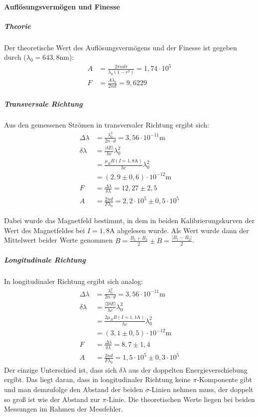 \paragraph{Auflösungsvermögen und Finesse}
\subparagraph{Theorie}
Der theoretische Wert des Auflösungsvermögens und der Finesse ist gegeben durch ($\lambda_0 =643,8 \si{\nano\meter}$):
\begin{align*}
A &= \frac{2\pi n d r}{\lambda_0 (1-r^2)} = 1,74\cdot 10^5\\
F &= \frac{A \lambda_0}{2 n d} = 9,6229 
\end{align*}

\subparagraph{Transversale Richtung}
Aus den gemessenen Strömen in transversaler Richtung ergibt sich:
\begin{align*}
\Delta \lambda &= \frac{\lambda_0^2}{2n\cdot d} = 3,56 \cdot 10^{-11} \si{\meter}\\
\delta \lambda &= \frac{|\delta E|}{hc}\lambda_0^2\\
	&= \frac{\mu_B B(I = 1,8\si{\ampere})}{hc}\lambda_0^2\\
	&= (2,9\pm 0,6) \cdot 10^{-12} \si{\meter}\\
F &= \frac{\Delta \lambda}{\delta\lambda} = 12,27 \pm 2,5\\
A&= \frac{2 n d}{F \lambda_0} = 2,2\cdot 10^5 \pm 0,5 \cdot 10^5
\end{align*}

Dabei wurde das Magnetfeld bestimmt, in dem in beiden Kalibrierungskurven der Wert des Magnetfeldes bei $I = 1,8 \si{\ampere}$ abgelesen wurde. Als Wert wurde dann der Mittelwert beider Werte genommen $B = \frac{B_1+B_2}{2} \pm B = \frac{|B_1-B_2|}{2}$.\\

\subparagraph{Longitudinale Richtung}
In longitudinaler Richtung ergibt sich analog:
\begin{align*}
\Delta \lambda &= \frac{\lambda_0^2}{2n\cdot d} = 3,56 \cdot 10^{-11} \si{\meter}\\
\delta \lambda &= \frac{|2\delta E|}{hc}\lambda_0^2\\
	&= \frac{2\mu_B B(I = 1,1\si{\ampere})}{hc}\lambda_0^2\\
	&= (3,1\pm 0,5) \cdot 10^{-12} \si{\meter}\\
F &= \frac{\Delta \lambda}{\delta\lambda} = 8,7 \pm 1,4\\
A&= \frac{2 n d}{F \lambda_0} = 1,5\cdot 10^5 \pm 0,3 \cdot 10^5
\end{align*}
Der einzige Unterschied ist, dass sich $\delta \lambda$ aus der doppelten Energieverschiebung ergibt. Das liegt daran, dass in longitudinaler Richtung keine $\pi$-Komponente gibt und man demzufolge den Abstand der beiden $\sigma$-Linien nehmen muss, der doppelt so groß ist wie der Abstand zur $\pi$-Linie. Die theoretischen Werte liegen bei beiden Messungen im Rahmen der Messfehler.\\

